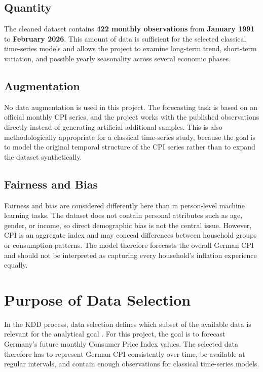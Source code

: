 \subsection{Quantity}

The cleaned dataset contains \textbf{422 monthly observations} from \textbf{January 1991} to \textbf{February 2026}. This amount of data is sufficient for the selected classical time-series models and allows the project to examine long-term trend, short-term variation, and possible yearly seasonality across several economic phases.

\subsection{Augmentation}

No data augmentation is used in this project. The forecasting task is based on an official monthly CPI series, and the project works with the published observations directly instead of generating artificial additional samples. This is also methodologically appropriate for a classical time-series study, because the goal is to model the original temporal structure of the CPI series rather than to expand the dataset synthetically.

\subsection{Fairness and Bias}

Fairness and bias are considered differently here than in person-level machine learning tasks. The dataset does not contain personal attributes such as age, gender, or income, so direct demographic bias is not the central issue. However, CPI is an aggregate index and may conceal differences between household groups or consumption patterns. The model therefore forecasts the overall German CPI and should not be interpreted as capturing every household's inflation experience equally.

\section{Purpose of Data Selection}

In the KDD process, data selection defines which subset of the available data is relevant for the analytical goal \cite{Fayyad:1996}. For this project, the goal is to forecast Germany's future monthly Consumer Price Index values. The selected data therefore has to represent German CPI consistently over time, be available at regular intervals, and contain enough observations for classical time-series models.

